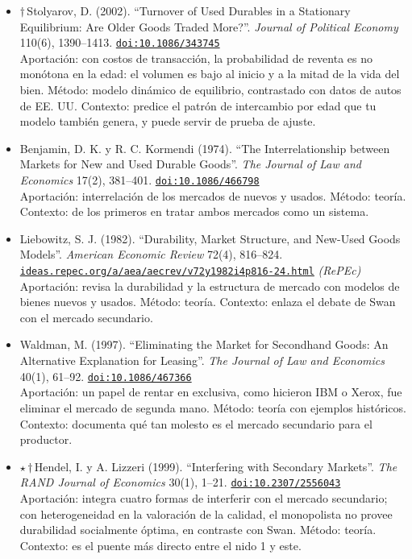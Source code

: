 \documentclass[11pt]{article}
\begin{document}
\begin{itemize}
\item $\dagger$\,Stolyarov, D. (2002). ``Turnover of Used Durables in a Stationary Equilibrium: Are Older Goods Traded More?''. \textit{Journal of Political Economy} 110(6), 1390--1413. \href{https://doi.org/10.1086/343745}{\texttt{doi:10.1086/343745}}\\
Aportación: con costos de transacción, la probabilidad de reventa es no monótona en la edad: el volumen es bajo al inicio y a la mitad de la vida del bien. Método: modelo dinámico de equilibrio, contrastado con datos de autos de EE. UU. Contexto: predice el patrón de intercambio por edad que tu modelo también genera, y puede servir de prueba de ajuste.
\item Benjamin, D. K. y R. C. Kormendi (1974). ``The Interrelationship between Markets for New and Used Durable Goods''. \textit{The Journal of Law and Economics} 17(2), 381--401. \href{https://doi.org/10.1086/466798}{\texttt{doi:10.1086/466798}}\\
Aportación: interrelación de los mercados de nuevos y usados. Método: teoría. Contexto: de los primeros en tratar ambos mercados como un sistema.
\item Liebowitz, S. J. (1982). ``Durability, Market Structure, and New-Used Goods Models''. \textit{American Economic Review} 72(4), 816--824. \href{https://ideas.repec.org/a/aea/aecrev/v72y1982i4p816-24.html}{\texttt{ideas.repec.org/a/aea/aecrev/v72y1982i4p816-24.html}} \textit{(RePEc)}\\
Aportación: revisa la durabilidad y la estructura de mercado con modelos de bienes nuevos y usados. Método: teoría. Contexto: enlaza el debate de Swan con el mercado secundario.
\item Waldman, M. (1997). ``Eliminating the Market for Secondhand Goods: An Alternative Explanation for Leasing''. \textit{The Journal of Law and Economics} 40(1), 61--92. \href{https://doi.org/10.1086/467366}{\texttt{doi:10.1086/467366}}\\
Aportación: un papel de rentar en exclusiva, como hicieron IBM o Xerox, fue eliminar el mercado de segunda mano. Método: teoría con ejemplos históricos. Contexto: documenta qué tan molesto es el mercado secundario para el productor.
\item $\star$\,$\dagger$\,Hendel, I. y A. Lizzeri (1999). ``Interfering with Secondary Markets''. \textit{The RAND Journal of Economics} 30(1), 1--21. \href{https://doi.org/10.2307/2556043}{\texttt{doi:10.2307/2556043}}\\
Aportación: integra cuatro formas de interferir con el mercado secundario; con heterogeneidad en la valoración de la calidad, el monopolista no provee durabilidad socialmente óptima, en contraste con Swan. Método: teoría. Contexto: es el puente más directo entre el nido 1 y este.
\end{itemize}
\end{document}
